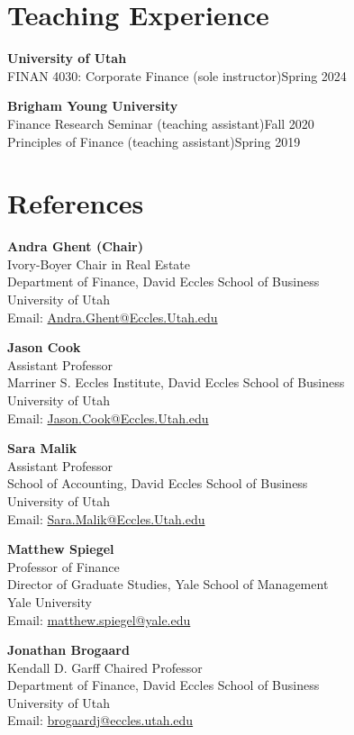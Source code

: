 \documentclass[11pt]{article}
\newcommand{\refentry}[5]{%
\textbf{#1}\\
#2\\
#3\\
#4\\
#5
}
\newcommand{\cvsection}[2][12]{%
\Needspace{#1\baselineskip}%
\section*{#2}%
}
\begin{document}
\cvsection{Teaching Experience}
\textbf{University of Utah}\\
FINAN 4030: Corporate Finance (sole instructor)\hfill Spring 2024

\textbf{Brigham Young University}\\
Finance Research Seminar (teaching assistant)\hfill Fall 2020\\
Principles of Finance (teaching assistant)\hfill Spring 2019

\clearpage
\cvsection[12]{References}
\begin{minipage}[t]{0.48\textwidth}\raggedright
\refentry
{Andra Ghent (Chair)}
{Ivory-Boyer Chair in Real Estate}
{Department of Finance, David Eccles School of Business}
{University of Utah}
{Email: \href{mailto:Andra.Ghent@Eccles.Utah.edu}{Andra.Ghent@Eccles.Utah.edu}}

\vspace{1em}
\refentry
{Jason Cook}
{Assistant Professor}
{Marriner S. Eccles Institute, David Eccles School of Business}
{University of Utah}
{Email: \href{mailto:Jason.Cook@Eccles.Utah.edu}{Jason.Cook@Eccles.Utah.edu}}

\vspace{1em}
\refentry
{Sara Malik}
{Assistant Professor}
{School of Accounting, David Eccles School of Business}
{University of Utah}
{Email: \href{mailto:Sara.Malik@Eccles.Utah.edu}{Sara.Malik@Eccles.Utah.edu}}
\end{minipage}\hfill
\begin{minipage}[t]{0.48\textwidth}\raggedright
\refentry
{Matthew Spiegel}
{Professor of Finance}
{Director of Graduate Studies, Yale School of Management}
{Yale University}
{Email: \href{mailto:matthew.spiegel@yale.edu}{matthew.spiegel@yale.edu}}

\vspace{1em}
\refentry
{Jonathan Brogaard}
{Kendall D. Garff Chaired Professor}
{Department of Finance, David Eccles School of Business}
{University of Utah}
{Email: \href{mailto:brogaardj@eccles.utah.edu}{brogaardj@eccles.utah.edu}}
\end{minipage}
\end{document}
